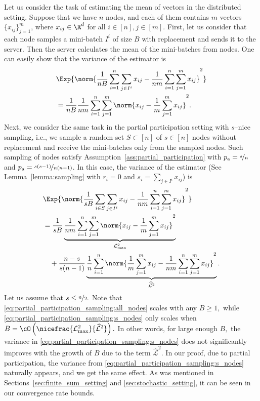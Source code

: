 \documentclass{article}
\newcommand*{\probavailable}{\ensuremath{p_{\textnormal{a}}}}
\begin{document}
Let us consider the task of estimating the mean of vectors in the distributed setting. Suppose that we have $n$ nodes, and each of them contains $m$ vectors $\{x_{ij}\}_{j=1}^m$, where $x_{ij} \in \R^d$ for all $i \in [n], j \in [m].$ First, let us consider that each node samples a mini-batch $I^i$ of size $B$ with replacement and sends it to the server. Then the server calculates the mean of the mini-batches from nodes. One can easily show that the variance of the estimator is
\begin{align}
  \label{eq:partial_participation_sampling:all_nodes}
  &\Exp{\norm{\frac{1}{n B}\sum_{i=1}^n \sum_{j \in I^i} x_{ij} - \frac{1}{n m}\sum_{i=1}^n \sum_{j=1}^m x_{ij}}^2} \\
  &= \frac{1}{n B} \frac{1}{n m} \sum_{i=1}^n \sum_{j=1}^m \norm{x_{ij} - \frac{1}{m}\sum_{j=1}^m x_{ij}}^2.\nonumber
\end{align}
Next, we consider the same task in the partial participation setting with $s$--nice sampling, i.e., we sample a random set $S \subset [n]$ of $s \in [n]$ nodes without replacement and receive the mini-batches only from the sampled nodes. Such sampling of nodes satisfy Assumption~\ref{ass:partial_participation} with $\probavailable = \nicefrac{s}{n}$ and $\probavailable = \nicefrac{s (s-1)}{n (n-1)}$. In this case, the variance of the estimator (See Lemma~\ref{lemma:sampling} with $r_i = 0$ and $s_i = \sum_{j \in I^i} x_{ij}$) is
\begin{align}
  \label{eq:partial_participation_sampling:s_nodes}
  &\Exp{\norm{\frac{1}{s B}\sum_{i \in S} \sum_{j \in I^i} x_{ij} - \frac{1}{n m}\sum_{i=1}^n \sum_{j=1}^m x_{ij}}^2} \\
  &= \frac{1}{s B}\underbrace{\frac{1}{n m} \sum_{i=1}^n \sum_{j=1}^m \norm{x_{ij} - \frac{1}{m}\sum_{j=1}^m x_{ij}}^2}_{\mathcal{L}_{\max}^2} \nonumber\\
  &\quad+\frac{n - s}{s (n - 1)} \underbrace{\frac{1}{n} \sum_{i=1}^n \norm{\frac{1}{m}\sum_{j=1}^m x_{ij} - \frac{1}{n m}\sum_{i=1}^n \sum_{j=1}^m x_{ij}}^2}_{\widehat{\mathcal{L}}^2} \nonumber.
\end{align}
Let us assume that $s \leq \nicefrac{n}{2}.$ Note that \eqref{eq:partial_participation_sampling:all_nodes} scales with any $B \geq 1,$ while \eqref{eq:partial_participation_sampling:s_nodes} only scales when $B = \cO\left(\nicefrac{\mathcal{L}_{\max}^2}{\widehat{\mathcal{L}}^2}\right).$ In other words, for large enough $B,$ the variance in \eqref{eq:partial_participation_sampling:s_nodes} does not significantly improves with the growth of $B$ due to the term $\widehat{\mathcal{L}}^2$. In our proof, due to partial participation, the variance from \eqref{eq:partial_participation_sampling:s_nodes} naturally appears, and we get the same effect. As was mentioned in Sections~\ref{sec:finite_sum_setting} and \ref{sec:stochastic_setting}, it can be seen in our convergence rate bounds.
\end{document}
